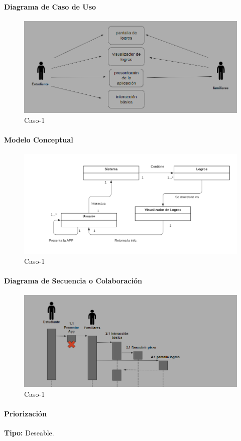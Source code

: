 \paragraph{Diagrama de Caso de Uso}

\begin{figure}[H]
\centerline{\includegraphics[width=15cm]{imgs/CasoUso_7.PNG}}
\caption{Caso-1}
\label{fig}
\end{figure}

\paragraph{Modelo Conceptual}

\begin{figure}[H]
\centerline{\includegraphics[width=15cm]{imgs/ModeloConceptualCaso_7_3.png}}
\caption{Caso-1}
\label{fig}
\end{figure}

\paragraph{Diagrama de Secuencia o Colaboración}

\begin{figure}[H]
\centerline{\includegraphics[width=15cm]{imgs/CasoUso_7_2.PNG}}
\caption{Caso-1}
\label{fig}
\end{figure}

\paragraph{Priorización}
{\textbf {Tipo:}}
Deseable.